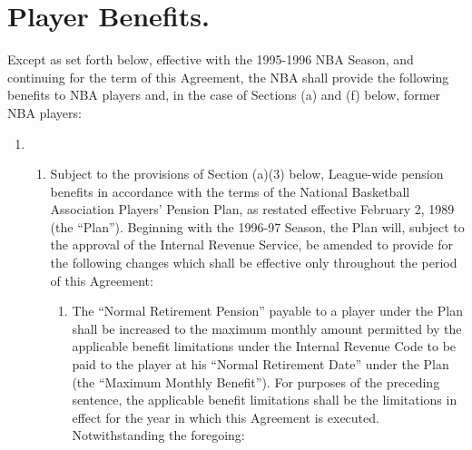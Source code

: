\documentclass[
]{book}
\providecommand{\tightlist}{%
  \setlength{\itemsep}{0pt}\setlength{\parskip}{0pt}}
\begin{document}
\hypertarget{player-benefits.}{%
\section{Player Benefits.}\label{player-benefits.}}

Except as set forth below, effective with the 1995-1996 NBA Season, and continuing for the term of this Agreement, the NBA shall provide the following benefits to NBA players and, in the case of Sections (a) and (f) below, former NBA players:

\begin{enumerate}
\def\labelenumi{(\alph{enumi})}
\item
  \begin{enumerate}
  \def\labelenumii{(\arabic{enumii})}
  \tightlist
  \item
    Subject to the provisions of Section (a)(3) below, League-wide pension benefits in accordance with the terms of the National Basketball Association Players' Pension Plan, as restated effective February 2, 1989 (the ``Plan''). Beginning with the 1996-97 Season, the Plan will, subject to the approval of the Internal Revenue Service, be amended to provide for the following changes which shall be effective only throughout the period of this Agreement:

    \begin{enumerate}
    \def\labelenumiii{(\roman{enumiii})}
    \tightlist
    \item
      The ``Normal Retirement Pension'' payable to a player under the Plan shall be increased to the maximum monthly amount permitted by the applicable benefit limitations under the Internal Revenue Code to be paid to the player at his ``Normal Retirement Date'' under the Plan (the ``Maximum Monthly Benefit''). For purposes of the preceding sentence, the applicable benefit limitations shall be the limitations in effect for the year in which this Agreement is executed. Notwithstanding the foregoing:


\end{enumerate}
\end{enumerate}
\end{enumerate}
\end{document}
